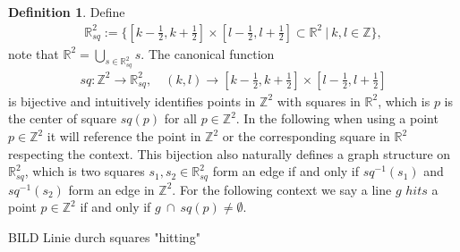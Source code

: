 \documentclass[12pt,a4paper]{scrartcl}
\numberwithin{equation}{subsection}
\newcommand{\1}{\mathbbm{1}}
\numberwithin{equation}{section}
\theoremstyle{definition}
\newtheorem{definition}{Definition}[subsection]
\begin{document}
\begin{definition} \label{squares}
	Define 
	\begin{align}
		\mathbb{R}^2_{sq} := \{[k - \frac{1}{2}, k + \frac{1}{2}] \times [l- \frac{1}{2}, l + \frac{1}{2}] \subset \mathbb{R}^2\ |\ k,l \in \mathbb{Z}\}, 
	\end{align} 
	note that $\mathbb{R}^2 = \bigcup_{s\in \mathbb{R}^2_{sq}} s$. The canonical function
	\begin{align}
	sq: \mathbb{Z}^2 \to \mathbb{R}^2_{sq},\quad (k,l)\to [k - \frac{1}{2}, k + \frac{1}{2}] \times [l- \frac{1}{2}, l + \frac{1}{2}]
	\end{align}
	is bijective and intuitively identifies points in $\mathbb{Z}^2$ with squares in $\mathbb{R}^2$, which is $p$ is the center of square $sq(p)$ for all $p\in \mathbb{Z}^2$. In the following when using a point $p\in \mathbb{Z}^2$ it will reference the point in $\mathbb{Z}^2$ or the corresponding square in $\mathbb{R}^2$ respecting the context. This bijection also naturally defines a graph structure on $\mathbb{R}^2_{sq}$, which is two squares $s_1, s_2\in \mathbb{R}^2_{sq}$ form an edge if and only if $sq^{-1}(s_1)$ and $sq^{-1}(s_2)$ form an edge in $\mathbb{Z}^2$. 
	\noindent For the following context we say a line $g$ $hits$ a point $p\in \mathbb{Z}^2$ if and only if $g\ \cap\ sq(p) \neq \emptyset$.
	
\end{definition}

BILD Linie durch squares "hitting"\\
\end{document}
